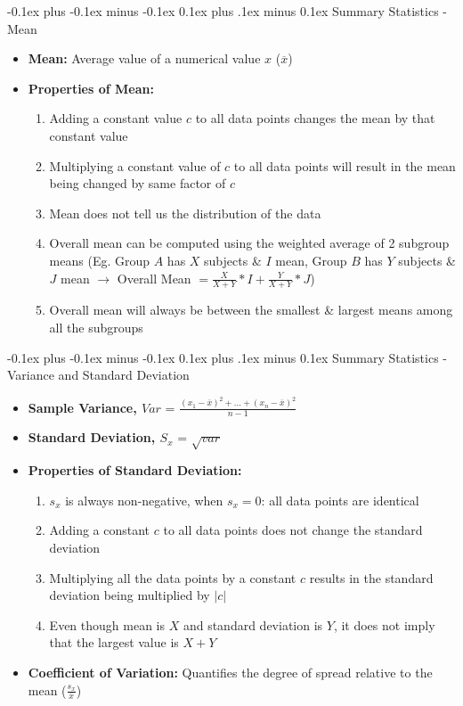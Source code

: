 \documentclass[landscape]{article}
\makeatletter
\renewcommand{\subsection}{\@startsection{subsection}{2}{0mm}%
  {-0.1ex plus -0.1ex minus -0.1ex}%
  {0.1ex plus .1ex minus 0.1ex}%
{\normalfont\scriptsize\bfseries}}
\makeatother
\begin{document}
\begin{multicols*}{5}
    \subsection{Summary Statistics - Mean}
      \begin{itemize}
        \item \textbf{Mean:} Average value of a numerical value $x$ ($\overline{x}$)
        \item \textbf{Properties of Mean:}
        \begin{enumerate}
          \item Adding a constant value $c$ to all data points changes the mean by that constant value
          \item Multiplying a constant value of $c$ to all data points will result in the mean being changed by same factor of $c$
          \item Mean does not tell us the distribution of the data
          \item Overall mean can be computed using the weighted average of 2 subgroup means (Eg. Group $A$ has $X$ subjects \& $I$ mean, Group $B$ has $Y$ subjects \& $J$ mean $\rightarrow$ Overall Mean $= \frac{X}{X+Y} * I + \frac{Y}{X+Y} * J$)
          \item Overall mean will always be between the smallest \& largest means among all the subgroups
        \end{enumerate}
      \end{itemize}

    \subsection{Summary Statistics - Variance and Standard Deviation}
      \begin{itemize}
        \item \textbf{Sample Variance, $Var$} = $\frac{(x_1 - \overline{x})^2 + ... + (x_n - \overline{x})^2}{n-1}$
        \item \textbf{Standard Deviation, $S_x$} = $\sqrt{var}$
        \item \textbf{Properties of Standard Deviation:}
        \begin{enumerate}
          \item $s_x$ is always non-negative, when $s_x = 0$: all data points are identical
          \item Adding a constant $c$ to all data points does not change the standard deviation
          \item Multiplying all the data points by a constant $c$ results in the standard deviation being multiplied by $|c|$
          \item Even though mean is $X$ and standard deviation is $Y$, it does not imply that the largest value is $X+Y$
        \end{enumerate}
        \item \textbf{Coefficient of Variation:} Quantifies the degree of spread relative to the mean ($\frac{s_x}{\overline{x}}$)
      \end{itemize}


\end{multicols*}
\end{document}
